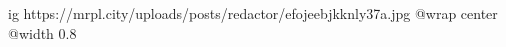  
 
 
 
 

\ifcmt
  ig https://mrpl.city/uploads/posts/redactor/efojeebjkknly37a.jpg
  @wrap center
  @width 0.8
\fi
